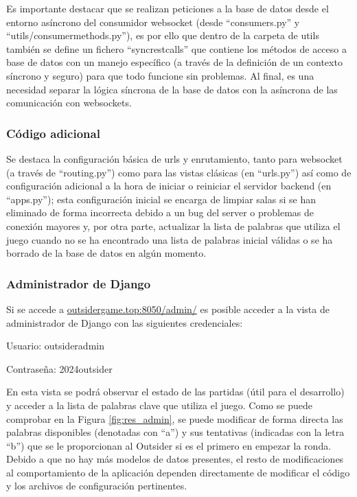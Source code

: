 Es importante destacar que se realizan peticiones a la base de datos desde el entorno asíncrono del consumidor websocket (desde ``consumers.py'' 
y ``utils/consumer\textunderscore methods.py''), es por ello que dentro de la carpeta de utils también se define un fichero ``sync\textunderscore rest\textunderscore calls'' que contiene 
los métodos de acceso a base de datos con un manejo específico (a través de la definición de un contexto síncrono y seguro) para que todo funcione sin problemas. Al final, es una necesidad
separar la lógica síncrona de la base de datos con la asíncrona de las comunicación con websockets.
	
\subsubsection{Código adicional}
Se destaca la configuración básica de urls y enrutamiento, tanto para websocket (a través de ``routing.py'') como para las vistas clásicas (en ``urls.py'') así como de 
configuración adicional a la hora de iniciar o reiniciar el servidor backend (en ``apps.py''); esta configuración inicial se encarga de limpiar salas si se han eliminado 
de forma incorrecta debido a un bug del server o problemas de conexión mayores y, por otra parte, actualizar la lista de palabras que utiliza el juego cuando no se ha encontrado
una lista de palabras inicial válidas o se ha borrado de la base de datos en algún momento.

\subsubsection{Administrador de Django}

Si se accede a \href{http://outsidergame.top:8050/admin/}{outsidergame.top:8050/admin/} es posible 
acceder a la vista de administrador de Django con las siguientes credenciales:

\begin{compactitem}
	\item Usuario: outsider\textunderscore admin
	\item Contraseña: 2024outsider
\end{compactitem}

En esta vista se podrá observar el estado de las partidas (útil para el desarrollo) y acceder a la lista
de palabras clave que utiliza el juego. Como se puede comprobar en la Figura \ref{fig:res_admin}, se puede modificar de forma
directa las palabras disponibles (denotadas con ``a'') y sus tentativas (indicadas con la letra ``b'') 
que se le proporcionan al Outsider si es el primero en empezar la ronda. Debido a que no hay más modelos de 
datos presentes, el resto de modificaciones al comportamiento de la aplicación dependen 
directamente de modificar el código y los archivos de configuración pertinentes.

